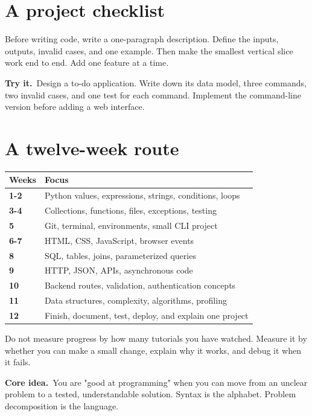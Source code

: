 \documentclass[11pt,openany,oneside]{book}
\newcommand{\keyidea}{\textsf{\bfseries\color{teal}Core idea.}\ }
\newcommand{\tryit}{\textsf{\bfseries\color{orange}Try it.}\ }
\begin{document}
\section{A project checklist}

Before writing code, write a one-paragraph description. Define the inputs, outputs, invalid cases, and one example. Then make the smallest vertical slice work end to end. Add one feature at a time.

\begin{exercisebox}
\tryit Design a to-do application. Write down its data model, three commands, two invalid cases, and one test for each command. Implement the command-line version before adding a web interface.
\end{exercisebox}

\section{A twelve-week route}

\begin{tabularx}{\textwidth}{>{\sffamily\bfseries\color{teal}}p{} X}
\toprule
Weeks & Focus \\
\midrule
1-2 & Python values, expressions, strings, conditions, loops \\
3-4 & Collections, functions, files, exceptions, testing \\
5 & Git, terminal, environments, small CLI project \\
6-7 & HTML, CSS, JavaScript, browser events \\
8 & SQL, tables, joins, parameterized queries \\
9 & HTTP, JSON, APIs, asynchronous code \\
10 & Backend routes, validation, authentication concepts \\
11 & Data structures, complexity, algorithms, profiling \\
12 & Finish, document, test, deploy, and explain one project \\
\bottomrule
\end{tabularx}

Do not measure progress by how many tutorials you have watched. Measure it by whether you can make a small change, explain why it works, and debug it when it fails.

\begin{keybox}
\keyidea You are "good at programming" when you can move from an unclear problem to a tested, understandable solution. Syntax is the alphabet. Problem decomposition is the language.
\end{keybox}
\end{document}
